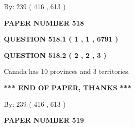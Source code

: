 \documentclass[12pt]{article}
\begin{document}
   
\hspace{1.0in} By: 
 239 ( 416 ,  613 )
   
   
   
   
\newpage 
\setcounter{page}{ 
   518001 } 
   
   
   
   
 {\textbf{ \Large{ PAPER NUMBER  518  }}}
   
   
\vspace{0.2in}
   
   
   
   
   
   
 \vspace{0.2in}
 
 
 
 
   
   
  
\vspace{0.2in}
  
{\textbf{\Large{QUESTION
518.1 
 ( 1 , 1 , 6791 )
}}}
  
  
  
\vspace{0.2in}
  
{\textbf{\Large{QUESTION
518.2 
 ( 2 , 2 , 3 )
}}}
  
  
 
 
\noindent{}
 
 
Canada has 10  provinces and 3 territories.
 
 
 
 
   
   
 \vspace{0.2in}
 
   
   
   
   
\vspace{1.0in} 
{\textbf{\large{ *** END OF PAPER, THANKS *** }}} 
   
   
\hspace{1.0in} By: 
 239 ( 416 ,  613 )
   
   
   
   
\newpage 
\setcounter{page}{ 
   519001 } 
   
   
   
   
 {\textbf{ \Large{ PAPER NUMBER  519  }}}
   
\end{document}
